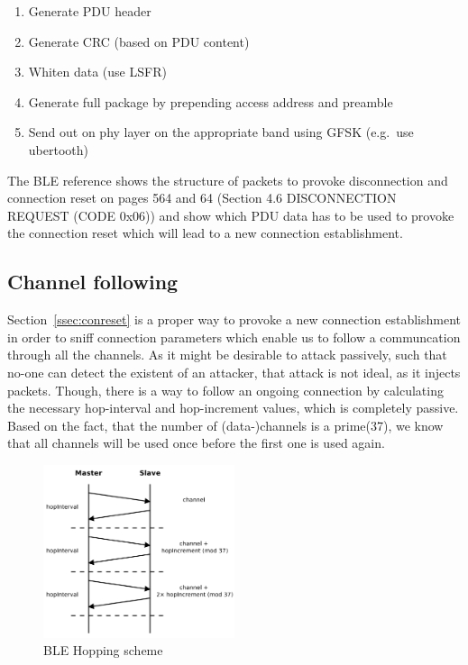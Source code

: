 \documentclass[conference]{IEEEtran}
\begin{document}
\begin{enumerate}
  \item Generate PDU header
  \item Generate CRC (based on PDU content)
  \item Whiten data (use LSFR)
  \item Generate full package by prepending access address and preamble
  \item Send out on phy layer on the appropriate band using GFSK (e.g.\ use ubertooth)
\end{enumerate}

The BLE reference shows the structure of packets to provoke disconnection and 
connection reset on pages 564 and 64 (Section 4.6 DISCONNECTION REQUEST (CODE 
0x06)) and show which PDU data has to be used to provoke the connection reset 
which will lead to a new connection establishment. \cite[p. 564]{ble40}

\subsection{Channel following}
\label{channelfollowing}

Section~\ref{ssec:conreset} is a proper way to provoke a new connection establishment in order to sniff connection parameters which enable us to follow a communcation through all the channels. As it might be desirable to attack passively, such that no-one can detect the existent of an attacker, that attack is not ideal, as it injects packets. Though, there is a way to follow an ongoing connection by calculating the necessary hop-interval and hop-increment values, which is completely passive. Based on the fact, that the number of (data-)channels is a prime(37), we know that all channels will be used once before the first one is used again.

\begin{figure}
  \centering
    \includegraphics[width=0.5\textwidth]{hopping}
    \caption{BLE Hopping scheme \cite{lowenergylowsecurity} }
  \label{fig:hopping}
\end{figure}
\end{document}
